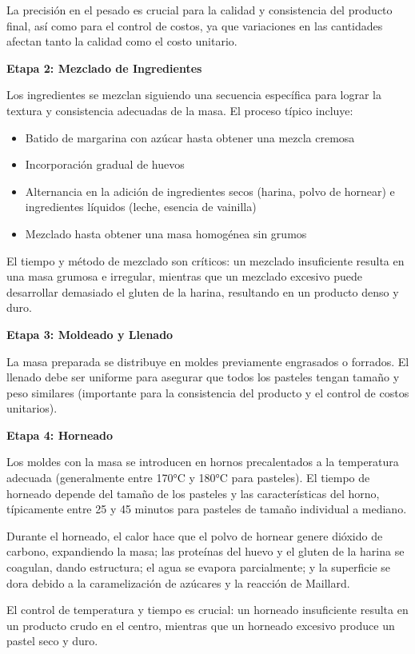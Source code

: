 \documentclass[
  stu,
  floatsintext,
  longtable,
  a4paper,
  nolmodern,
  notxfonts,
  notimes,
  12pt,
  colorlinks=true,linkcolor=blue,citecolor=blue,urlcolor=blue]{apa7}
\providecommand{\tightlist}{%
  \setlength{\itemsep}{0pt}\setlength{\parskip}{0pt}}
\begin{document}
La precisión en el pesado es crucial para la calidad y consistencia del
producto final, así como para el control de costos, ya que variaciones
en las cantidades afectan tanto la calidad como el costo unitario.

\textbf{Etapa 2: Mezclado de Ingredientes}

Los ingredientes se mezclan siguiendo una secuencia específica para
lograr la textura y consistencia adecuadas de la masa. El proceso típico
incluye:

\begin{itemize}
\tightlist
\item
  Batido de margarina con azúcar hasta obtener una mezcla cremosa
\item
  Incorporación gradual de huevos
\item
  Alternancia en la adición de ingredientes secos (harina, polvo de
  hornear) e ingredientes líquidos (leche, esencia de vainilla)
\item
  Mezclado hasta obtener una masa homogénea sin grumos
\end{itemize}

El tiempo y método de mezclado son críticos: un mezclado insuficiente
resulta en una masa grumosa e irregular, mientras que un mezclado
excesivo puede desarrollar demasiado el gluten de la harina, resultando
en un producto denso y duro.

\textbf{Etapa 3: Moldeado y Llenado}

La masa preparada se distribuye en moldes previamente engrasados o
forrados. El llenado debe ser uniforme para asegurar que todos los
pasteles tengan tamaño y peso similares (importante para la consistencia
del producto y el control de costos unitarios).

\textbf{Etapa 4: Horneado}

Los moldes con la masa se introducen en hornos precalentados a la
temperatura adecuada (generalmente entre 170°C y 180°C para pasteles).
El tiempo de horneado depende del tamaño de los pasteles y las
características del horno, típicamente entre 25 y 45 minutos para
pasteles de tamaño individual a mediano.

Durante el horneado, el calor hace que el polvo de hornear genere
dióxido de carbono, expandiendo la masa; las proteínas del huevo y el
gluten de la harina se coagulan, dando estructura; el agua se evapora
parcialmente; y la superficie se dora debido a la caramelización de
azúcares y la reacción de Maillard.

El control de temperatura y tiempo es crucial: un horneado insuficiente
resulta en un producto crudo en el centro, mientras que un horneado
excesivo produce un pastel seco y duro.
\end{document}
